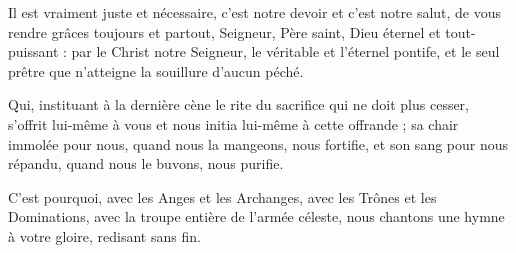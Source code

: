 Il est vraiment juste et nécessaire,
c’est notre devoir et c’est notre salut,
de vous rendre grâces toujours et partout,
Seigneur, Père saint, Dieu éternel et tout-puissant :
par le Christ notre Seigneur,
le véritable et l’éternel pontife,
et le seul prêtre que n’atteigne la souillure d’aucun péché.

Qui, instituant à la dernière cène le rite du sacrifice qui ne doit plus cesser,
s’offrit lui-même à vous et nous initia lui-même à cette offrande ;
sa chair immolée pour nous, quand nous la mangeons, nous fortifie,
et son sang pour nous répandu, quand nous le buvons, nous purifie.

C’est pourquoi, avec les Anges et les Archanges,
avec les Trônes et les Dominations,
avec la troupe entière de l’armée céleste,
nous chantons une hymne à votre gloire,
redisant sans fin.
